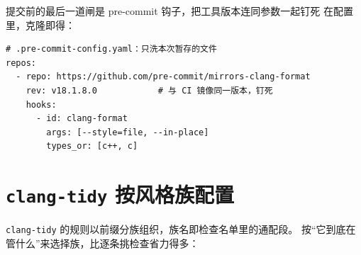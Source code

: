 \documentclass[12pt,a4paper,fontset=fandol]{ctexbook}
\newcommand{\Tp}[1]{\texttt{#1}}
\begin{document}
提交前的最后一道闸是 pre-commit 钩子，把工具版本连同参数一起钉死
在配置里，克隆即得：

\begin{lstlisting}[style=yamlstyle]
# .pre-commit-config.yaml：只洗本次暂存的文件
repos:
  - repo: https://github.com/pre-commit/mirrors-clang-format
    rev: v18.1.8.0            # 与 CI 镜像同一版本，钉死
    hooks:
      - id: clang-format
        args: [--style=file, --in-place]
        types_or: [c++, c]
\end{lstlisting}

\section{\Tp{clang-tidy} 按风格族配置}
\label{sec:ch13-tidy}

\Tp{clang-tidy} 的规则以前缀分族组织，族名即检查名单里的通配段。
按``它到底在管什么''来选择族，比逐条挑检查省力得多：
\end{document}
